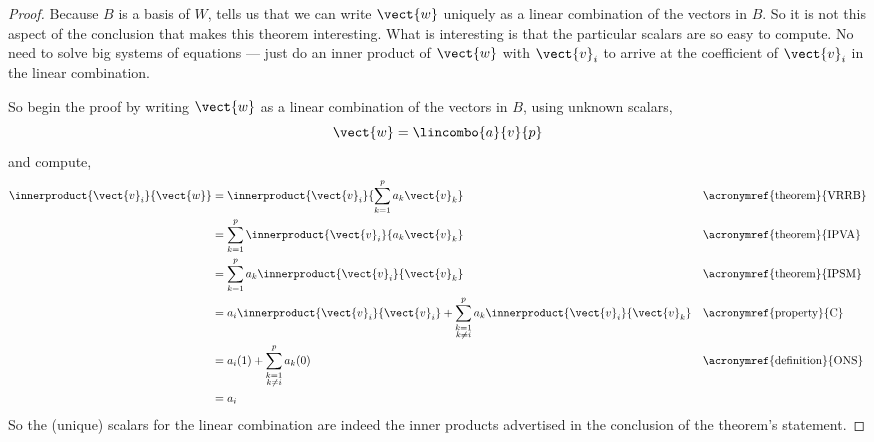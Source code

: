 \begin{proof}
Because $B$ is a basis of $W$,  tells us that we can write $\vect{w}$ uniquely as a linear combination of the vectors in $B$.  So it is not this aspect of the conclusion that makes this theorem interesting.  What is interesting is that the particular scalars are so easy to compute.  No need to solve big systems of equations --- just do an inner product of $\vect{w}$ with $\vect{v}_i$ to arrive at the coefficient of $\vect{v}_i$ in the linear combination.\par
%
So begin the proof by writing $\vect{w}$ as a linear combination of the vectors in $B$, using unknown scalars,
%
\begin{equation*}
\vect{w}=\lincombo{a}{v}{p}
\end{equation*}
%
and compute,
%
\begin{align*}
\innerproduct{\vect{v}_i}{\vect{w}}
&=\innerproduct{\vect{v}_i}{\sum_{k=1}^{p}a_k\vect{v}_k}
&&\text{\acronymref{theorem}{VRRB}}\\
%
&=\sum_{k=1}^{p}\innerproduct{\vect{v}_i}{a_k\vect{v}_k}
&&\text{\acronymref{theorem}{IPVA}}\\
%
&=\sum_{k=1}^{p}a_k\innerproduct{\vect{v}_i}{\vect{v}_k}
&&\text{\acronymref{theorem}{IPSM}}\\
%
&=a_i\innerproduct{\vect{v}_i}{\vect{v}_i}+
\sum_{\substack{k=1\\k\neq i}}^{p}a_k\innerproduct{\vect{v}_i}{\vect{v}_k}
&&\text{\acronymref{property}{C}}\\
%
&=a_i(1)+\sum_{\substack{k=1\\k\neq i}}^{p}a_k(0)
&&\text{\acronymref{definition}{ONS}}\\
%
&=a_i
\end{align*}
%
So the (unique) scalars for the linear combination are indeed the inner products advertised in the conclusion of the theorem's statement.
\end{proof}
%
%
